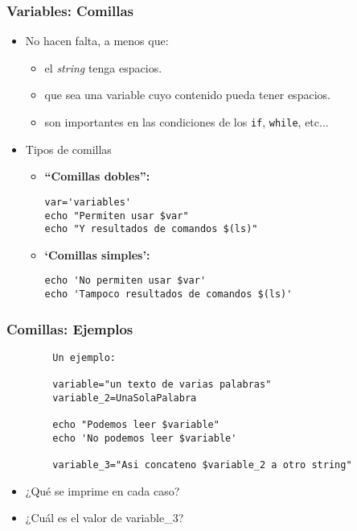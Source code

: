 \begin{frame}[fragile]
  \frametitle{Variables: Comillas}
  \begin{itemize}
  \item No hacen falta, a menos que:
    \begin{itemize}
    \item el \textit{string} tenga espacios.
    \item que sea una variable cuyo contenido pueda tener espacios.
    \item son importantes en las condiciones de los \texttt{if}, \texttt{while}, etc...
    \end{itemize}
  \item Tipos de comillas
    \begin{itemize}
    \item \textbf{``Comillas dobles'':}
      \begin{lstlisting}
var='variables'
echo "Permiten usar $var"
echo "Y resultados de comandos $(ls)"
     \end{lstlisting}
    \item \textbf{`Comillas simples':}
      \begin{lstlisting}
echo 'No permiten usar $var'
echo 'Tampoco resultados de comandos $(ls)'
      \end{lstlisting}
    \end{itemize}
  \end{itemize}
\end{frame}

\begin{frame}[fragile]
	\frametitle{Comillas: Ejemplos}
	\begin{lstlisting}
		Un ejemplo:

		variable="un texto de varias palabras"
		variable_2=UnaSolaPalabra

		echo "Podemos leer $variable"
		echo 'No podemos leer $variable'

		variable_3="Asi concateno $variable_2 a otro string"
	\end{lstlisting}
	\begin{itemize}
		\item ¿Qué se imprime en cada caso?
		\item ¿Cuál es el valor de variable\_3?
	\end{itemize}
\end{frame}
